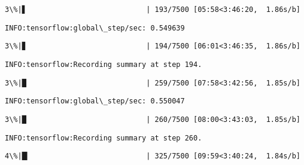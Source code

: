 \documentclass[11pt]{article}
\begin{document}
    \begin{Verbatim}[commandchars=\\\{\}]
  3\%|▋                            | 193/7500 [05:58<3:46:20,  1.86s/b]
    \end{Verbatim}

    \begin{Verbatim}[commandchars=\\\{\}]
INFO:tensorflow:global\_step/sec: 0.549639

    \end{Verbatim}

    \begin{Verbatim}[commandchars=\\\{\}]
  3\%|▊                            | 194/7500 [06:01<3:46:35,  1.86s/b]
    \end{Verbatim}

    \begin{Verbatim}[commandchars=\\\{\}]
INFO:tensorflow:Recording summary at step 194.

    \end{Verbatim}

    \begin{Verbatim}[commandchars=\\\{\}]
  3\%|█                            | 259/7500 [07:58<3:42:56,  1.85s/b]
    \end{Verbatim}

    \begin{Verbatim}[commandchars=\\\{\}]
INFO:tensorflow:global\_step/sec: 0.550047

    \end{Verbatim}

    \begin{Verbatim}[commandchars=\\\{\}]
  3\%|█                            | 260/7500 [08:00<3:43:03,  1.85s/b]
    \end{Verbatim}

    \begin{Verbatim}[commandchars=\\\{\}]
INFO:tensorflow:Recording summary at step 260.

    \end{Verbatim}

    \begin{Verbatim}[commandchars=\\\{\}]
  4\%|█▎                           | 325/7500 [09:59<3:40:24,  1.84s/b]
    \end{Verbatim}
\end{document}

